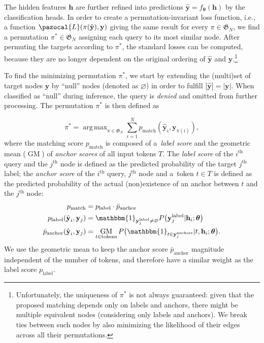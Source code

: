 \documentclass[11pt,a4paper]{article}
\DeclareMathOperator*{\argmax}{arg\,max}
\DeclareMathOperator*{\geomean}{GM}
\begin{document}
The hidden features $\textbf{h}$ are further refined into predictions $\hat{\textbf{y}} = f_{\bm{\theta}}(\mathbf{h})$ by the classification heads. In order to create a permutation-invariant loss function, i.e., a function $\pazocal{L}(\pi(\hat{\textbf{y}}), \textbf{y})$ giving the same result for every $\pi \in \mathfrak{G}_N$, we find a permutation $\pi^* \in \mathfrak{G}_N$ assigning each query to its most similar node. After permuting the targets according to $\pi^*$, the standard losses can be computed, because they are no longer dependent on the original ordering of $\hat{\textbf{y}}$ and $\textbf{y}$.\hspace{-.08em}\footnote{Unfortunately, the uniqueness of $\pi^*$ is not always guaranteed: given that the proposed matching depends only on labels and anchors, there might be multiple equivalent nodes (considering only labels and anchors). We break ties between such nodes by also minimizing the likelihood of their edges across all their permutations.}

To find the minimizing permutation $\pi^*$, we start by extending the (multi)set of target nodes $\textbf{y}$ by ``null'' nodes (denoted as $\varnothing$) in order to fulfill $\left\vert \hat{\textbf{y}} \right\vert = \left\vert \textbf{y} \right\vert$. When classified as ``null'' during inference, the query is \emph{denied} and omitted from further processing. The permutation $\pi^*$ is then defined as

\begin{equation} \label{eq:optimal_matching}
\pi^* = \argmax_{\pi \in \mathfrak{G}_N} \sum_{i=1}^{N}p_{\textrm{match}}(\hat{\textbf{y}}_i, \mathbf{y}_{\pi(i)}),
\end{equation}
where the matching score $p_{\textrm{match}}$ is composed of a~\emph{label score} and the geometric mean ($\geomean$) of \emph{anchor scores} of all input tokens $T$. The \emph{label score} of the $i^\textrm{th}$ query and the $j^\textrm{th}$ node is defined as the predicted probability of the target $j^\textrm{th}$ label; the \emph{anchor score} of the $i^\textrm{th}$ query, $j^\textrm{th}$ node and a~token $t \in T$ is defined as the predicted probability of the actual (non)existence of an anchor between $t$ and the $j^\textrm{th}$ node:
\begin{align*}
    p_{\textrm{match}} &= p_{\textrm{label}} \cdot \bar{p}_{\textrm{anchor}} \\
    p_{\textrm{label}}(\hat{\textbf{y}}_i, \mathbf{y}_j) &= \mathbbm{1}_{\mathbf{y}_j^{\textrm{label}} \neq \varnothing} P\big(\mathbf{y}_j^{\textrm{label}} \vert \mathbf{h}_i; {\bm{\theta}}\big) \\
    \bar{p}_{\textrm{anchor}}(\hat{\textbf{y}}_i, \mathbf{y}_j) &= \geomean_{t \in \textrm{tokens}} P\big(\mathbbm{1}_{t \in \textbf{y}_j^{\textrm{anchors}}} \vert t, \textbf{h}_i; \bm{\theta}\big).
\end{align*}
We use the geometric mean to keep the anchor score $\bar{p}_{\textrm{anchor}}$ magnitude independent of the number of tokens, and therefore have a similar weight as the label score $p_{\textrm{label}}$.
\end{document}
